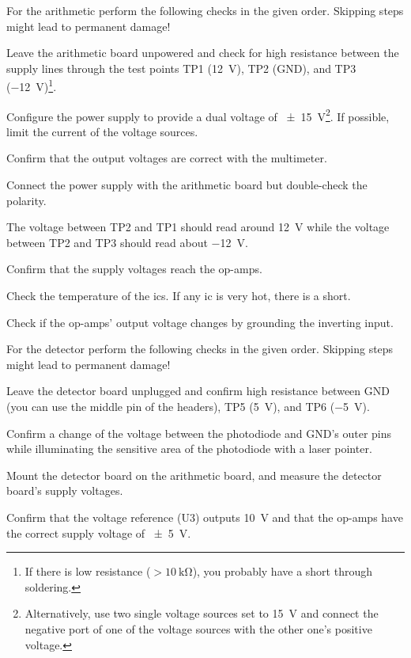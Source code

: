 For the arithmetic perform the following checks in the given order.
Skipping steps might lead to permanent damage!
\begin{todolist}
	\item Leave the arithmetic board unpowered and check for high resistance between the supply lines through the test points TP1 (\SI{+12}{\volt}), TP2 (GND), and TP3 (\SI{-12}{\volt})\footnote{If there is low resistance ($>\SI{10}{\kilo\ohm}$), you probably have a short through soldering.}.
	\item Configure the power supply to provide a dual voltage of \SI{\pm15}{\volt}\footnote{Alternatively, use two single voltage sources set to \SI{15}{\volt} and connect the negative port of one of the voltage sources with the other one's positive voltage.}. If possible, limit the current of the voltage sources.
	\item Confirm that the output voltages are correct with the multimeter.
	\item Connect the power supply with the arithmetic board but double-check the polarity.
	\item The voltage between TP2 and TP1 should read around \SI{+12}{\volt} while the voltage between TP2 and TP3 should read about \SI{-12}{\volt}.
	\item Confirm that the supply voltages reach the op-amps.
	\item Check the temperature of the \gls{ic}s. If any \gls{ic} is very hot, there is a short.
	\item Check if the op-amps' output voltage changes by grounding the inverting input.
\end{todolist}

For the detector perform the following checks in the given order.
Skipping steps might lead to permanent damage!
\begin{todolist}
	\item Leave the detector board unplugged and confirm high resistance between GND (you can use the middle pin of the headers), TP5 (\SI{+5}{\volt}), and TP6 (\SI{-5}{\volt}).
	\item Confirm a change of the voltage between the photodiode and GND's outer pins while illuminating the sensitive area of the photodiode with a laser pointer.
	\item Mount the detector board on the arithmetic board, and measure the detector board's supply voltages.
	\item Confirm that the voltage reference (U3) outputs \SI{10}{\volt} and that the op-amps have the correct supply voltage of \SI{\pm5}{\volt}.
\end{todolist}

